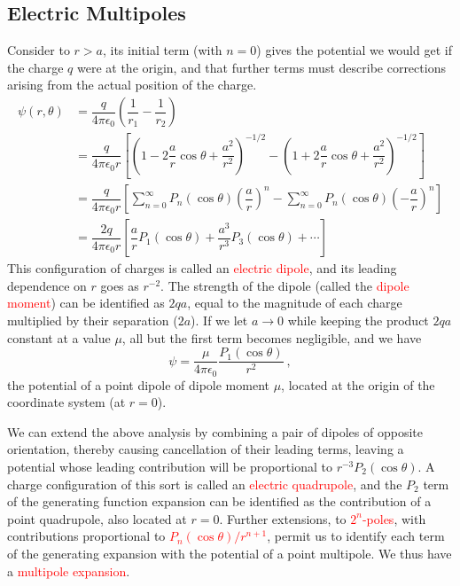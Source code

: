\documentclass[12pt,a4paper]{article}
\begin{document}
\subsection{Electric Multipoles}
Consider to $r > a$, its initial term (with $n = 0$) gives the potential we would get if the charge $q$ were at the origin, and that further terms must describe corrections arising from the actual position of the charge.
\begin{align}
\nonumber \psi(r, \theta) &= \dfrac{q}{4\pi \epsilon_0} \left(\dfrac{1}{r_1} - \dfrac{1}{r_2}\right) \\
\nonumber &= \dfrac{q}{4\pi \epsilon_0 r} \left[\left(1 -2\dfrac{a}{r} \cos \theta +\dfrac{a^2}{r^2} \right)^{-1/2} - \left(1 +2\dfrac{a}{r} \cos \theta +\dfrac{a^2}{r^2} \right)^{-1/2}\right] \\
\nonumber &= \dfrac{q}{4\pi \epsilon_0 r} \left[\sum_{n=0}^\infty P_n(\cos \theta) \left(\dfrac{a}{r} \right)^n - \sum_{n=0}^\infty P_n(\cos \theta) \left(-\dfrac{a}{r} \right)^n \right] \\
&= \dfrac{2q}{4\pi \epsilon_0 r} \left[\dfrac{a}{r} P_1(\cos \theta) +\dfrac{a^3}{r^3} P_3(\cos \theta) +\cdots \right]
\end{align}
This configuration of charges is called an \textcolor{red}{electric dipole}, and its leading dependence on $r$ goes as $r^{-2}$. The strength of the dipole (called the \textcolor{red}{dipole moment}) can be identified as $2qa$, equal to the magnitude of each charge multiplied by their separation ($2a$). If we let $a \rightarrow 0$ while keeping the product $2qa$ constant at a value $\mu$, all but the first term becomes negligible, and we have
\begin{equation}
 \psi = \dfrac{\mu}{4\pi \epsilon_0} \dfrac{P_1(\cos \theta)}{r^2} ~,
\end{equation}
the potential of a point dipole of dipole moment $\mu$, located at the origin of the coordinate system (at $r = 0$). 

We can extend the above analysis by combining a pair of dipoles of opposite orientation, thereby causing cancellation of their leading terms, leaving a potential whose leading contribution will be proportional to $r^{-3} P_2(\cos \theta)$. A charge configuration of this sort is called an \textcolor{red}{electric quadrupole}, and the $P_2$ term of the generating function expansion can be identified as the contribution of a point quadrupole, also located at $r = 0$. Further extensions, to \textcolor{red}{$2^n$-poles}, with contributions proportional to \textcolor{red}{$P_n(\cos \theta)/r^{n+1}$}, permit us to identify each term of the generating expansion with the potential of a point multipole. We thus have a \textcolor{red}{multipole expansion}.
\end{document}
